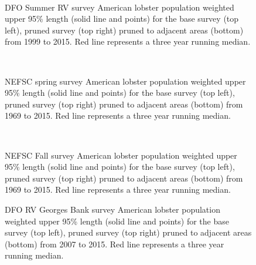 \documentclass[11pt]{article}
\newcommand{\D}{.}
\newcommand{\e}{/backup/bio_data/bio.lobster/figures/} %
\begin{document}


\begin{figure}
\centering
{}\\
\caption{DFO Summer RV survey American lobster population weighted upper 95\% length (solid line and points) for the base survey (top left), pruned survey (top right) pruned to adjacent areas (bottom) from 1999 to 2015. Red line represents a three year running median.  }
\end{figure}
\clearpage


\begin{figure}
\centering
{}\\
\caption{NEFSC spring survey American lobster population weighted upper 95\% length (solid line and points) for the base survey (top left), pruned survey (top right) pruned to adjacent areas (bottom) from 1969 to 2015. Red line represents a three year running median.}
\end{figure}
\clearpage



\begin{figure}
\centering
{}\\
\caption{NEFSC Fall survey American lobster population weighted upper 95\% length (solid line and points) for the base survey (top left), pruned survey (top right) pruned to adjacent areas (bottom) from 1969 to 2015. Red line represents a three year running median.}
\end{figure}
\clearpage


\begin{figure}

    \caption{DFO RV Georges Bank survey American lobster population weighted upper 95\% length (solid line and points) for the base survey (top left), pruned survey (top right) pruned to adjacent areas (bottom) from 2007 to 2015. Red line represents a three year running median.}

\end{figure}
\end{document}

